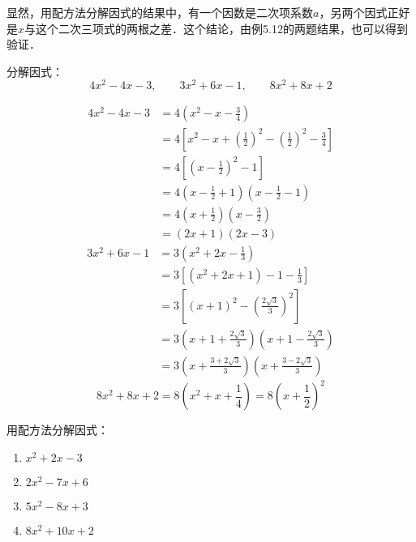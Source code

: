 显然，用配方法分解因式的结果中，有一个因数是二次项系数$a$，另两个因式正好是$x$与这个二次三项式的两根之差．这个结论，由例5.12的两题结果，也可以得到验证．

\begin{example}
  分解因式： 
\[4x^2-4x-3,\qquad 3x^2+6x-1,\qquad 8x^2+8x+2 \] 
\end{example}



\begin{solution}
 \[\begin{split}
    4x^2-4x-3&=4\left(x^2-x-\frac{3}{4}\right)\\
    &=4\left[x^2-x+\left(\frac{1}{2}\right)^2-\left(\frac{1}{2}\right)^2-\frac{3}{4}\right]\\
    &=4\left[\left(x-\frac{1}{2}\right)^2-1\right]\\
    &=4\left(x-\frac{1}{2}+1\right)\left(x-\frac{1}{2}-1\right)\\
    &=4\left(x+\frac{1}{2}\right)\left(x-\frac{3}{2}\right)\\
    &=(2x+1)(2x-3)
 \end{split}\]   
 \[\begin{split}
    3x^2+6x-1&=3\left(x^2+2x-\frac{1}{3}\right)\\
    &=3\left[(x^2+2x+1)-1-\frac{1}{3}\right]\\
    &=3\left[(x+1)^2-\left(\frac{2\sqrt{3}}{3}\right)^2\right]\\
    &=3\left(x+1+\frac{2\sqrt{3}}{3}\right)\left(x+1-\frac{2\sqrt{3}}{3}\right)\\
    &=3\left(x+\frac{3+2\sqrt{3}}{3}\right)\left(x+\frac{3-2\sqrt{3}}{3}\right)
 \end{split}\]  
 \[
    8x^2+8x+2=8\left(x^2+x+\frac{1}{4}\right) =8\left(x+\frac{1}{2}\right)^2
\]  
\end{solution}

\begin{ex}
    用配方法分解因式：
\begin{multicols}{2}
    \begin{enumerate}
        \item $x^2+2x-3$
        \item $2x^2-7x+6$
        \item $5x^2-8x+3$
        \item $8x^2+10x+2$
    \end{enumerate}
\end{multicols} 
\end{ex}

